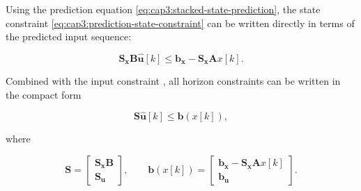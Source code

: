 Using the prediction equation \eqref{eq:cap3:stacked-state-prediction}, the state constraint \eqref{eq:cap3:prediction-state-constraint} can be written directly in terms of the predicted input sequence:

\noindent
\begin{equation}
	\mathbf{S_x} \mathbf{B} \mathbf{\hat{u}}[k] \le \mathbf{b_x} - \mathbf{S_x} \mathbf{A} x[k].
\end{equation}

\noindent
Combined with the input constraint , all horizon constraints can be written in the compact form

\noindent
\begin{equation}
	\mathbf{S} \mathbf{\hat{u}}[k] \le \mathbf{b}(x[k]),
\end{equation}

\noindent
where

\noindent
\begin{equation}
	\mathbf{S} =
	\left[
		\begin{matrix}
			\mathbf{S_x} \mathbf{B} \\
			\mathbf{S_u}
		\end{matrix}
	\right],
	\qquad
	\mathbf{b}(x[k]) =
	\left[
		\begin{matrix}
			\mathbf{b_x} - \mathbf{S_x} \mathbf{A} x[k] \\
			\mathbf{b_u}
		\end{matrix}
	\right].
\end{equation}
